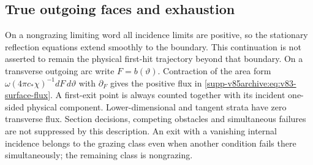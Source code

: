 \subsection{True outgoing faces and exhaustion}
On a nongrazing limiting word all incidence limits are positive, so
the stationary reflection equations extend smoothly to the boundary.
This continuation is not asserted to remain the physical first-hit
trajectory beyond that boundary. On a transverse outgoing arc write
$F=b(\vartheta)$. Contraction of the area form
$\omega(4\pi c_*\chi)^{-1}dF\,d\vartheta$ with $\partial_F$
gives the positive flux in \eqref{supp-v85archive:eq:v83-surface-flux}. A first-exit
point is always counted together with its incident one-sided physical
component. Lower-dimensional and tangent strata have zero transverse
flux. Section decisions, competing obstacles and simultaneous failures
are not suppressed by this description. An exit with a vanishing
internal incidence belongs to the grazing class even when another
condition fails there simultaneously; the remaining class is nongrazing.

